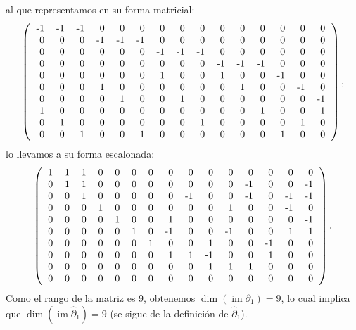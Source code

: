 \documentclass[12pt]{book}
\theoremstyle{definition}
\DeclareMathOperator{\im}{im}
\newcounter{in}
\newcounter{ini}
\begin{document}
al que representamos en su forma matricial:
\[ \left(
  \begin{tabular}{rrrrrrrrrrrrrrr}
    -1 & -1 & -1 & 0  & 0  & 0  & 0  & 0  & 0  & 0  & 0  & 0  & 0  & 0  & 0  \\
    0  & 0  & 0  & -1 & -1 & -1 & 0  & 0  & 0  & 0  & 0  & 0  & 0  & 0  & 0  \\
    0  & 0  & 0  & 0  & 0  & 0  & -1 & -1 & -1 & 0  & 0  & 0  & 0  & 0  & 0  \\
    0  & 0  & 0  & 0  & 0  & 0  & 0  & 0  & 0  & -1 & -1 & -1 & 0  & 0  & 0  \\
    0  & 0  & 0  & 0  & 0  & 0  & 1  & 0  & 0  & 1  & 0  & 0  & -1 & 0  & 0  \\
    0  & 0  & 0  & 1  & 0  & 0  & 0  & 0  & 0  & 0  & 1  & 0  & 0  & -1 & 0  \\
    0  & 0  & 0  & 0  & 1  & 0  & 0  & 1  & 0  & 0  & 0  & 0  & 0  & 0  & -1 \\
    1  & 0  & 0  & 0  & 0  & 0  & 0  & 0  & 0  & 0  & 0  & 1  & 0  & 0  & 1  \\
    0  & 1  & 0  & 0  & 0  & 0  & 0  & 0  & 1  & 0  & 0  & 0  & 0  & 1  & 0  \\
    0  & 0  & 1  & 0  & 0  & 1  & 0  & 0  & 0  & 0  & 0  & 0  & 1  & 0  & 0 
  \end{tabular}
\right),\] 
lo llevamos a su forma escalonada:
\[ \left(
  \begin{tabular}{rrrrrrrrrrrrrrr}
    1 & 1 & 1 & 0 & 0 & 0 & 0 & 0  & 0  & 0  & 0  & 0  & 0  & 0  & 0  \\
    0 & 1 & 1 & 0 & 0 & 0 & 0 & 0  & 0  & 0  & 0  & -1 & 0  & 0  & -1 \\
    0 & 0 & 1 & 0 & 0 & 0 & 0 & 0  & -1 & 0  & 0  & -1 & 0  & -1 & -1 \\
    0 & 0 & 0 & 1 & 0 & 0 & 0 & 0  & 0  & 0  & 1  & 0  & 0  & -1 & 0  \\
    0 & 0 & 0 & 0 & 1 & 0 & 0 & 1  & 0  & 0  & 0  & 0  & 0  & 0  & -1 \\
    0 & 0 & 0 & 0 & 0 & 1 & 0 & -1 & 0  & 0  & -1 & 0  & 0  & 1  & 1  \\
    0 & 0 & 0 & 0 & 0 & 0 & 1 & 0  & 0  & 1  & 0  & 0  & -1 & 0  & 0  \\
    0 & 0 & 0 & 0 & 0 & 0 & 0 & 1  & 1  & -1 & 0  & 0  & 1  & 0  & 0  \\
    0 & 0 & 0 & 0 & 0 & 0 & 0 & 0  & 0  & 1  & 1  & 1  & 0  & 0  & 0  \\
    0 & 0 & 0 & 0 & 0 & 0 & 0 & 0  & 0  & 0  & 0  & 0  & 0  & 0  & 0 
  \end{tabular}
\right).\]
Como el rango de la matriz es 9, obtenemos $\dim(\im\partial_{1})=9$, lo cual implica que
$\dim(\im\widehat\partial_{1})=9$ (se sigue de la definición de
$\widehat\partial_{1}$).
\end{document}
